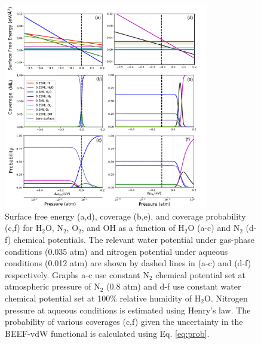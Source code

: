 \documentclass[journal=ascecg,manuscript=article,articletitle=true]{achemso}
\begin{document}
\begin{figure}
\centering
\includegraphics[width=0.8\textwidth]{figures/surface_phase_diagrams}

\caption{Surface free energy (a,d), coverage (b,e), and coverage probability (c,f) for H$_2$O, N$_2$, O$_2$, and OH as a function of H$_2$O (a-c) and N$_2$ (d-f) chemical potentials. The relevant water potential under gas-phase conditions (0.035 atm) and nitrogen potential under aqueous conditions (0.012 atm) are shown by dashed lines in (a-c) and (d-f) respectively. Graphs a-c use constant N$_2$ chemical potential set at atmospheric pressure of N$_2$ (0.8 atm) and d-f use constant water chemical potential set at 100\% relative humidity of H$_2$O. Nitrogen pressure at aqueous conditions is estimated using Henry's law. The probability of various coverages (c,f) given the uncertainty in the BEEF-vdW functional is calculated using Eq. \ref{eq:prob}.}
\label{fig:surface_diagram}
\end{figure}
\end{document}
